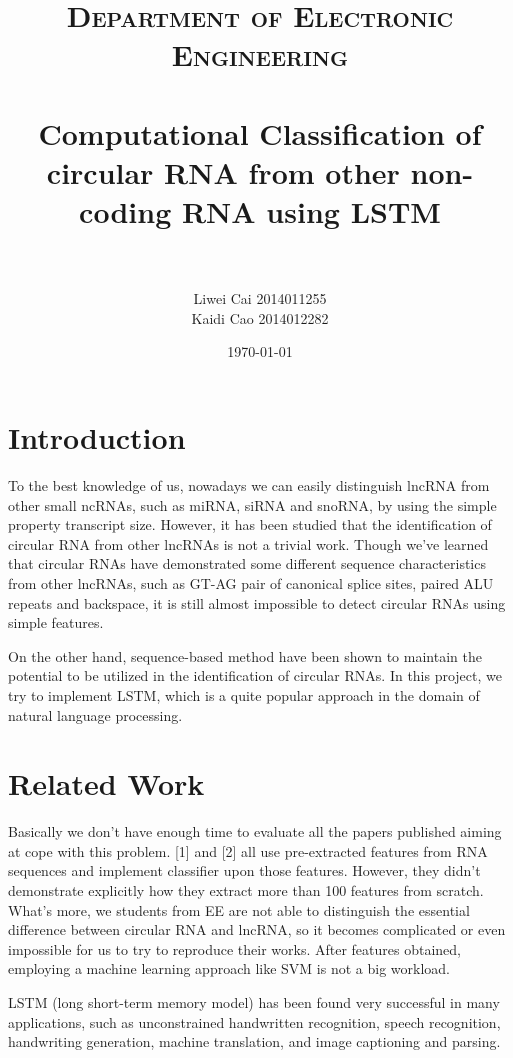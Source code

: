 \documentclass[10pt,a4paper]{article}
\title{	
	\normalfont \normalsize
	\textsc{Department of Electronic Engineering} \\ [25pt]
	\horrule{0.5pt} \\[0.4cm] %
	\huge Computational Classification of circular RNA from other non-coding RNA using LSTM\\ %
	\horrule{2pt} \\[0.5cm] %
}
\author{ Liwei Cai 2014011255\\
	Kaidi Cao 2014012282 } %
\date{\normalsize\today} %
\begin{document}
	
	\begin{spacing}{1.5}
		\begin{titlepage}
			\maketitle %
		\end{titlepage}
		
		\newpage
		
		\section{Introduction}
		
		To the best knowledge of us, nowadays we can easily distinguish lncRNA from other small ncRNAs, such as miRNA, siRNA and snoRNA, by using the simple property transcript size. However, it has been studied that the identification of circular RNA from other lncRNAs is not a trivial work. Though we've learned that circular RNAs have demonstrated some different sequence characteristics from other lncRNAs, such as GT-AG pair of canonical splice sites, paired ALU repeats and backspace, it is still almost impossible to detect circular RNAs using simple features. 
		
		On the other hand, sequence-based method have been shown to maintain the potential to be utilized in the identification of circular RNAs. In this project, we try to implement LSTM, which is a quite popular approach in the domain of natural language processing. 
		
		\section{Related Work}
		
		Basically we don't have enough time to evaluate all the papers published aiming at cope with this problem. [1] and [2] all use pre-extracted features from RNA sequences and implement classifier upon those features. However, they didn't demonstrate explicitly how they extract more than 100 features from scratch. What's more, we students from EE are not able to distinguish the essential difference between circular RNA and lncRNA, so it becomes complicated or even impossible for us to try to reproduce their works. After features obtained, employing a machine learning approach like SVM is not a big workload.
		
		LSTM (long short-term memory model) has been found very successful in many applications, such as unconstrained handwritten recognition, speech recognition, handwriting generation, machine translation, and image captioning and parsing. 
		

\end{spacing}
\end{document}
